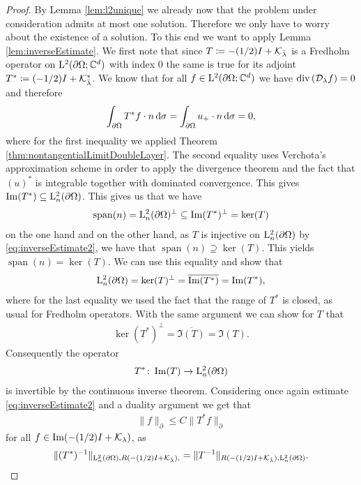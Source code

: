 \begin{proof}
  By Lemma \ref{lem:l2unique} we already now that the problem under consideration admits at most one solution.
  Therefore we only have to worry about the existence of a solution.
  To this end we want to apply Lemma \ref{lem:inverseEstimate}.
  We first note that since $T \coloneqq -(1/2) I + \mathcal{K}_{\bar \lambda}$ is a Fredholm operator on $\mathrm{L}^2(\partial\Omega; \mathbb{C}^d)$ with index $0$ the same is true for its adjoint $T^* \coloneqq (-1/2)I + \mathcal{K}_{\bar\lambda}^*$.
  We know that for all $f \in \mathrm{L}^2(\partial\Omega; \mathbb{C}^d)$ we have $\mathrm{div\,} (\mathcal{D}_\lambda f) = 0$ and therefore
  \begin{align*}
    \int_{\partial\Omega} T^* f \cdot n \, {\operatorname{d}\!{\sigma}} =\int_{\partial\Omega} u_+ \cdot n \, {\operatorname{d}\!{\sigma}} =  0, 
  \end{align*}
  where for the first inequality we applied Theorem \ref{thm:nontangentialLimitDoubleLayer}. The second equality uses Verchota's approximation scheme in order to apply the divergence theorem and the fact that $(u)^*$ is integrable together with dominated convergence.
  This gives $\operatorname{Im}(T^*) \subseteq \mathrm{L}_n^2(\partial\Omega)$.
  This gives us that we have 
  \begin{align*}
    \operatorname{span}(n)
    = \mathrm{L}_n^2(\partial\Omega)^\perp
    \subseteq \operatorname{Im}(T^*)^\perp
    = \ker(T)
  \end{align*}
  on the one hand and on the other hand, as $T$ is injective on $\mathrm{L}^2_n(\partial\Omega)$ by \eqref{eq:inverseEstimate2}, we have that $ \operatorname{span}(n) \supseteq \ker(T)$.
  This yields $\operatorname{span}(n) = \ker(T)$.
  We can use this equality and show that
  \begin{align*}
    \mathrm{L}^2_n(\partial\Omega) = \ker(T)^\perp = \overline{\operatorname{Im}(T^*)} = \operatorname{Im}(T^*),
  \end{align*}
  where for the last equality we used the fact that the range of $T^*$ is closed, as usual for Fredholm operators.
  With the same argument we can show for $T$ that
  \begin{align*}
    \ker(T^*)^\perp = \overline{\Im(T)} = \Im(T).
  \end{align*}
  Consequently the operator
  \begin{align*}
    T^* \colon \operatorname{Im}(T) \to \mathrm{L}^2_n(\partial\Omega)
  \end{align*}
  is invertible by the continuous inverse theorem.
  Considering once again estimate \eqref{eq:inverseEstimate2} and a duality argument we get that
  \begin{align}
    \label{eq:dualityArgument}
    \|f\|_\partial \leq C \| T^* f\|_\partial
  \end{align}
  for all $f \in \operatorname{Im}(-(1/2)I + \mathcal{K}_\lambda)$, as
  \begin{align*}
    \| (T^*)^{-1} \|_{ \mathrm{L}^2_n(\partial\Omega), R(-(1/2)I + \mathcal{K}_{\bar\lambda}),} = \| T^{-1} \|_{R(-(1/2) I + \mathcal{K}_{\bar\lambda}), \mathrm{L}^2_n(\partial\Omega)}.
  \end{align*}


\end{proof}
